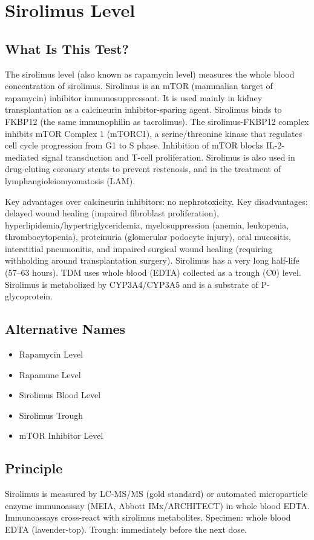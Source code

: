\chapter{Sirolimus Level}
\section*{What Is This Test?}
The sirolimus level (also known as rapamycin level) measures the whole blood concentration of sirolimus. Sirolimus is an mTOR (mammalian target of rapamycin) inhibitor immunosuppressant. It is used mainly in kidney transplantation as a calcineurin inhibitor-sparing agent. Sirolimus binds to FKBP12 (the same immunophilin as tacrolimus). The sirolimus-FKBP12 complex inhibits mTOR Complex 1 (mTORC1), a serine/threonine kinase that regulates cell cycle progression from G1 to S phase. Inhibition of mTOR blocks IL-2-mediated signal transduction and T-cell proliferation. Sirolimus is also used in drug-eluting coronary stents to prevent restenosis, and in the treatment of lymphangioleiomyomatosis (LAM).

Key advantages over calcineurin inhibitors: no nephrotoxicity. Key disadvantages: delayed wound healing (impaired fibroblast proliferation), hyperlipidemia/hypertriglyceridemia, myelosuppression (anemia, leukopenia, thrombocytopenia), proteinuria (glomerular podocyte injury), oral mucositis, interstitial pneumonitis, and impaired surgical wound healing (requiring withholding around transplantation surgery). Sirolimus has a very long half-life (57--63 hours). TDM uses whole blood (EDTA) collected as a trough (C0) level. Sirolimus is metabolized by CYP3A4/CYP3A5 and is a substrate of P-glycoprotein.
\section*{Alternative Names}
\begin{itemize}
  \item Rapamycin Level
  \item Rapamune Level
  \item Sirolimus Blood Level
  \item Sirolimus Trough
  \item mTOR Inhibitor Level
\end{itemize}
\section*{Principle}
Sirolimus is measured by LC-MS/MS (gold standard) or automated microparticle enzyme immunoassay (MEIA, Abbott IMx/ARCHITECT) in whole blood EDTA. Immunoassays cross-react with sirolimus metabolites. Specimen: whole blood EDTA (lavender-top). Trough: immediately before the next dose.
